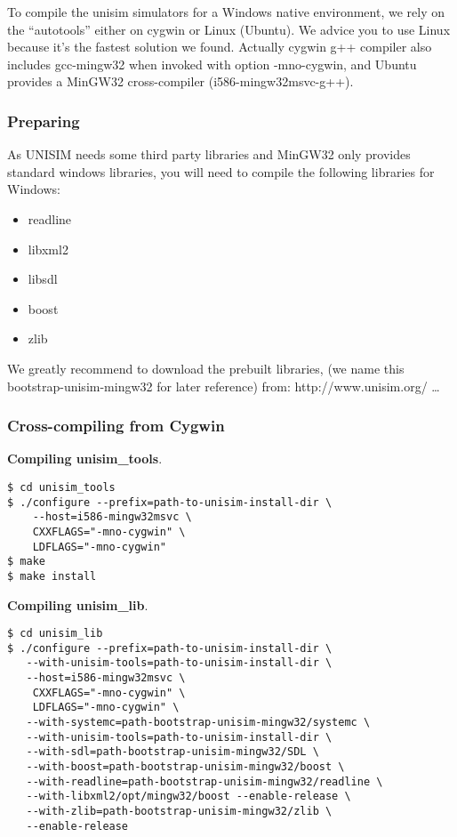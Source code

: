 To compile the unisim simulators for a Windows native environment, we rely on the ``autotools'' either on cygwin or Linux (Ubuntu).
We advice you to use Linux because it's the fastest solution we found.
Actually cygwin g++ compiler also includes gcc-mingw32 when invoked with option -mno-cygwin, and Ubuntu provides a MinGW32 cross-compiler (i586-mingw32msvc-g++).

\subsubsection{Preparing}
As UNISIM needs some third party libraries and MinGW32 only provides standard windows libraries, you will need to compile the following libraries for Windows:
\begin{itemize}
\item readline
\item libxml2
\item libsdl
\item boost
\item zlib
\end{itemize}

We greatly recommend to download the prebuilt libraries,  (we name this bootstrap-unisim-mingw32 for later reference) from: http://www.unisim.org/ \ldots

\subsubsection{Cross-compiling from Cygwin}

\noindent \textbf{Compiling unisim\_tools}.

\begin{verbatim}
$ cd unisim_tools
$ ./configure --prefix=path-to-unisim-install-dir \
    --host=i586-mingw32msvc \
    CXXFLAGS="-mno-cygwin" \
    LDFLAGS="-mno-cygwin"
$ make
$ make install
\end{verbatim}

\noindent \textbf{Compiling unisim\_lib}.

\begin{verbatim}
$ cd unisim_lib
$ ./configure --prefix=path-to-unisim-install-dir \
   --with-unisim-tools=path-to-unisim-install-dir \
   --host=i586-mingw32msvc \
    CXXFLAGS="-mno-cygwin" \
    LDFLAGS="-mno-cygwin" \
   --with-systemc=path-bootstrap-unisim-mingw32/systemc \
   --with-unisim-tools=path-to-unisim-install-dir \
   --with-sdl=path-bootstrap-unisim-mingw32/SDL \
   --with-boost=path-bootstrap-unisim-mingw32/boost \
   --with-readline=path-bootstrap-unisim-mingw32/readline \
   --with-libxml2/opt/mingw32/boost --enable-release \
   --with-zlib=path-bootstrap-unisim-mingw32/zlib \
   --enable-release
\end{verbatim}

